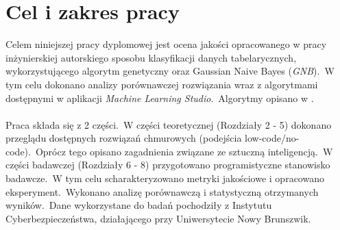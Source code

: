\section{Cel i zakres pracy}
Celem niniejszej pracy dyplomowej jest ocena jakości opracowanego w pracy inżynierskiej autorskiego sposobu klasyfikacji danych tabelarycznych, wykorzystującego algorytm genetyczny oraz Gaussian Naive Bayes (\textit{GNB}).\ W tym celu dokonano analizy porównawczej rozwiązania wraz z algorytmami dostępnymi w aplikacji \textit{Machine Learning Studio}.\ Algorytmy opisano w .
\\ \\
Praca składa się z 2 części.\ W części teoretycznej (Rozdziały 2 - 5) dokonano przeglądu dostępnych rozwiązań chmurowych (podejścia low-code/no-code).\ Oprócz tego opisano zagadnienia związane ze sztuczną inteligencją.\ W części badawczej (Rozdziały 6 - 8) przygotowano programistyczne stanowisko badawcze.\ W tym celu scharakteryzowano metryki jakościowe i opracowano eksperyment.\ Wykonano analizę porównawczą i statystyczną otrzymanych wyników.\ Dane wykorzystane do badań pochodziły z Instytutu Cyberbezpieczeństwa, działającego przy Uniwersytecie Nowy Brunszwik.

